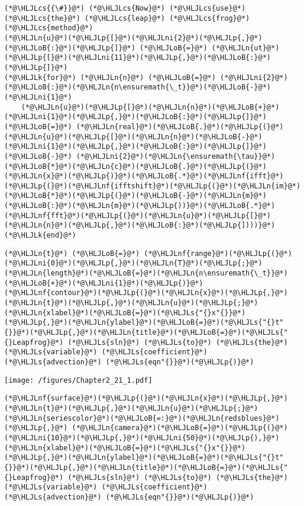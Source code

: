 \documentclass[12pt,a4paper]{article}
\newcommand{\HLJLk}[1]{\textcolor[RGB]{148,91,176}{\textbf{#1}}}
\newcommand{\HLJLn}[1]{#1}
\newcommand{\HLJLnf}[1]{\textcolor[RGB]{66,102,213}{#1}}
\newcommand{\HLJLs}[1]{\textcolor[RGB]{201,61,57}{#1}}
\newcommand{\HLJLni}[1]{\textcolor[RGB]{59,151,46}{#1}}
\newcommand{\HLJLoB}[1]{\textcolor[RGB]{102,102,102}{\textbf{#1}}}
\newcommand{\HLJLp}[1]{#1}
\newcommand{\HLJLcs}[1]{\textcolor[RGB]{153,153,119}{\textit{#1}}}
\begin{document}
\begin{lstlisting}
(*@\HLJLcs{{\#}}@*) (*@\HLJLcs{Now}@*) (*@\HLJLcs{use}@*) (*@\HLJLcs{the}@*) (*@\HLJLcs{leap}@*) (*@\HLJLcs{frog}@*) (*@\HLJLcs{method}@*)
(*@\HLJLn{u}@*)(*@\HLJLp{[}@*)(*@\HLJLni{2}@*)(*@\HLJLp{,}@*)(*@\HLJLoB{:}@*)(*@\HLJLp{]}@*) (*@\HLJLoB{=}@*) (*@\HLJLn{ut}@*)(*@\HLJLp{[}@*)(*@\HLJLni{11}@*)(*@\HLJLp{,}@*)(*@\HLJLoB{:}@*)(*@\HLJLp{]}@*)
(*@\HLJLk{for}@*) (*@\HLJLn{n}@*) (*@\HLJLoB{=}@*) (*@\HLJLni{2}@*)(*@\HLJLoB{:}@*)(*@\HLJLn{n\ensuremath{\_t}}@*)(*@\HLJLoB{-}@*)(*@\HLJLni{1}@*)
    (*@\HLJLn{u}@*)(*@\HLJLp{[}@*)(*@\HLJLn{n}@*)(*@\HLJLoB{+}@*)(*@\HLJLni{1}@*)(*@\HLJLp{,}@*)(*@\HLJLoB{:}@*)(*@\HLJLp{]}@*) (*@\HLJLoB{=}@*) (*@\HLJLn{real}@*)(*@\HLJLoB{.}@*)(*@\HLJLp{(}@*)(*@\HLJLn{u}@*)(*@\HLJLp{[}@*)(*@\HLJLn{n}@*)(*@\HLJLoB{-}@*)(*@\HLJLni{1}@*)(*@\HLJLp{,}@*)(*@\HLJLoB{:}@*)(*@\HLJLp{]}@*) (*@\HLJLoB{-}@*) (*@\HLJLni{2}@*)(*@\HLJLn{\ensuremath{\tau}}@*)(*@\HLJLoB{*}@*)(*@\HLJLn{c}@*)(*@\HLJLoB{.}@*)(*@\HLJLp{(}@*)(*@\HLJLn{x}@*)(*@\HLJLp{)}@*)(*@\HLJLoB{.*}@*)(*@\HLJLnf{ifft}@*)(*@\HLJLp{(}@*)(*@\HLJLnf{ifftshift}@*)(*@\HLJLp{(}@*)(*@\HLJLn{im}@*)(*@\HLJLoB{*}@*)(*@\HLJLp{(}@*)(*@\HLJLoB{-}@*)(*@\HLJLn{m}@*)(*@\HLJLoB{:}@*)(*@\HLJLn{m}@*)(*@\HLJLp{))}@*)(*@\HLJLoB{.*}@*)(*@\HLJLnf{fft}@*)(*@\HLJLp{(}@*)(*@\HLJLn{u}@*)(*@\HLJLp{[}@*)(*@\HLJLn{n}@*)(*@\HLJLp{,}@*)(*@\HLJLoB{:}@*)(*@\HLJLp{])))}@*)
(*@\HLJLk{end}@*)
\end{lstlisting}


\begin{lstlisting}
(*@\HLJLn{t}@*) (*@\HLJLoB{=}@*) (*@\HLJLnf{range}@*)(*@\HLJLp{(}@*)(*@\HLJLni{0}@*)(*@\HLJLp{,}@*)(*@\HLJLn{T}@*)(*@\HLJLp{;}@*)(*@\HLJLn{length}@*)(*@\HLJLoB{=}@*)(*@\HLJLn{n\ensuremath{\_t}}@*)(*@\HLJLoB{+}@*)(*@\HLJLni{1}@*)(*@\HLJLp{)}@*)
(*@\HLJLnf{contour}@*)(*@\HLJLp{(}@*)(*@\HLJLn{x}@*)(*@\HLJLp{,}@*)(*@\HLJLn{t}@*)(*@\HLJLp{,}@*)(*@\HLJLn{u}@*)(*@\HLJLp{;}@*)(*@\HLJLn{xlabel}@*)(*@\HLJLoB{=}@*)(*@\HLJLs{"{}x"{}}@*)(*@\HLJLp{,}@*)(*@\HLJLn{ylabel}@*)(*@\HLJLoB{=}@*)(*@\HLJLs{"{}t"{}}@*)(*@\HLJLp{,}@*)(*@\HLJLn{title}@*)(*@\HLJLoB{=}@*)(*@\HLJLs{"{}Leapfrog}@*) (*@\HLJLs{sln}@*) (*@\HLJLs{to}@*) (*@\HLJLs{the}@*) (*@\HLJLs{variable}@*) (*@\HLJLs{coefficient}@*) (*@\HLJLs{advection}@*) (*@\HLJLs{eqn"{}}@*)(*@\HLJLp{)}@*)
\end{lstlisting}

\texttt{[image: /figures/Chapter2\_21\_1.pdf]}

\begin{lstlisting}
(*@\HLJLnf{surface}@*)(*@\HLJLp{(}@*)(*@\HLJLn{x}@*)(*@\HLJLp{,}@*)(*@\HLJLn{t}@*)(*@\HLJLp{,}@*)(*@\HLJLn{u}@*)(*@\HLJLp{;}@*)(*@\HLJLn{seriescolor}@*)(*@\HLJLoB{=:}@*)(*@\HLJLn{redsblues}@*)(*@\HLJLp{,}@*) (*@\HLJLn{camera}@*)(*@\HLJLoB{=}@*)(*@\HLJLp{(}@*)(*@\HLJLni{10}@*)(*@\HLJLp{,}@*)(*@\HLJLni{50}@*)(*@\HLJLp{),}@*)
(*@\HLJLn{xlabel}@*)(*@\HLJLoB{=}@*)(*@\HLJLs{"{}x"{}}@*)(*@\HLJLp{,}@*)(*@\HLJLn{ylabel}@*)(*@\HLJLoB{=}@*)(*@\HLJLs{"{}t"{}}@*)(*@\HLJLp{,}@*)(*@\HLJLn{title}@*)(*@\HLJLoB{=}@*)(*@\HLJLs{"{}Leapfrog}@*) (*@\HLJLs{sln}@*) (*@\HLJLs{to}@*) (*@\HLJLs{the}@*) (*@\HLJLs{variable}@*) (*@\HLJLs{coefficient}@*) (*@\HLJLs{advection}@*) (*@\HLJLs{eqn"{}}@*)(*@\HLJLp{)}@*)
\end{lstlisting}
\end{document}
